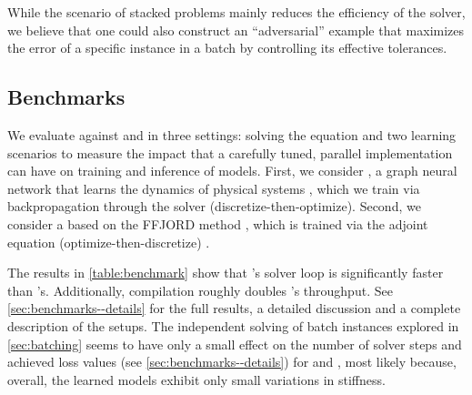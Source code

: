 \documentclass{article}
\begin{document}
While the scenario of stacked \vdp{} problems mainly reduces the efficiency of the solver, we believe that one could also construct an ``adversarial'' example that maximizes the error of a specific instance in a batch by controlling its effective tolerances.

\subsection{Benchmarks}\label{sec:benchmarks}

We evaluate \torchode{} against \torchdiffeq{} and \torchdyn{} in three settings: solving the \vdp{} equation and two learning scenarios to measure the impact that a carefully tuned, parallel implementation can have on training and inference of \ml{} models. First, we consider \fen{}, a graph neural network that learns the dynamics of physical systems \citep{lienen2022learning}, which we train via backpropagation through the solver (discretize-then-optimize). Second, we consider a \cnf{} based on the FFJORD method \citep{grathwohl2019ffjord}, which is trained via the adjoint equation (optimize-then-discretize) \citep{chen2018neural}.

The results in \cref{table:benchmark} show that \torchode{}'s solver loop is significantly faster than \torchdiffeq{}'s. Additionally, \jit{} compilation roughly doubles \torchode{}'s throughput. See \cref{sec:benchmarks--details} for the full results, a detailed discussion and a complete description of the setups. The independent solving of batch instances explored in \cref{sec:batching} seems to have only a small effect on the number of solver steps and achieved loss values (see \cref{sec:benchmarks--details}) for \fen{} and \cnf{}, most likely because, overall, the learned models exhibit only small variations in stiffness.
\end{document}
